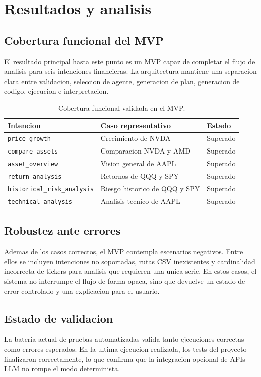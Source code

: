 \chapter{Resultados y analisis}

\section{Cobertura funcional del MVP}

El resultado principal hasta este punto es un MVP capaz de completar el flujo de analisis para seis intenciones financieras. La arquitectura mantiene una separacion clara entre validacion, seleccion de agente, generacion de plan, generacion de codigo, ejecucion e interpretacion.

\begin{table}[h]
\centering
\begin{tabular}{lll}
\toprule
\textbf{Intencion} & \textbf{Caso representativo} & \textbf{Estado} \\
\midrule
\texttt{price\_growth} & Crecimiento de NVDA & Superado \\
\texttt{compare\_assets} & Comparacion NVDA y AMD & Superado \\
\texttt{asset\_overview} & Vision general de AAPL & Superado \\
\texttt{return\_analysis} & Retornos de QQQ y SPY & Superado \\
\texttt{historical\_risk\_analysis} & Riesgo historico de QQQ y SPY & Superado \\
\texttt{technical\_analysis} & Analisis tecnico de AAPL & Superado \\
\bottomrule
\end{tabular}
\caption{Cobertura funcional validada en el MVP.}
\end{table}

\section{Robustez ante errores}

Ademas de los casos correctos, el MVP contempla escenarios negativos. Entre ellos se incluyen intenciones no soportadas, rutas CSV inexistentes y cardinalidad incorrecta de tickers para analisis que requieren una unica serie. En estos casos, el sistema no interrumpe el flujo de forma opaca, sino que devuelve un estado de error controlado y una explicacion para el usuario.

\section{Estado de validacion}

La bateria actual de pruebas automatizadas valida tanto ejecuciones correctas como errores esperados. En la ultima ejecucion realizada, los tests del proyecto finalizaron correctamente, lo que confirma que la integracion opcional de APIs LLM no rompe el modo determinista.
